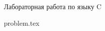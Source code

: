 \documentclass [11pt, a4paper, oneside] {article}
\begin{document}
\contest
{Лабораторная работа по языку C}%
{}%
{}%


\renewcommand{\t}{\texttt}

{problem.tex}
\end{document}
